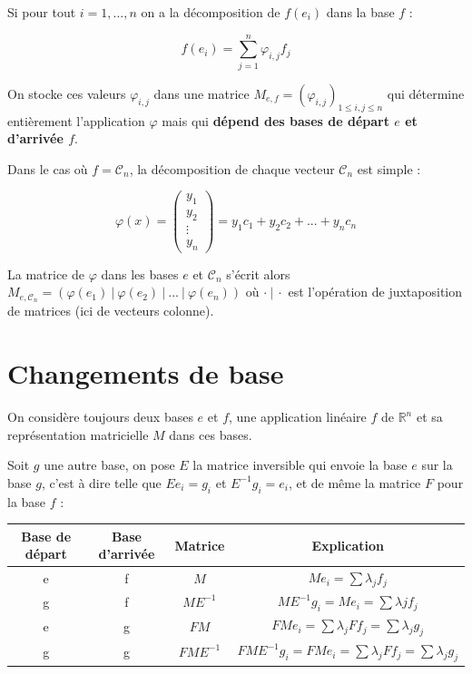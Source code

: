 \documentclass[]{article}
\theoremstyle{remark}
\theoremstyle{definition}
\begin{document}
	Si pour tout $i=1, ..., n$ on a la décomposition de $f(e_i)$ dans la base $f$ :
	
	$$f(e_i) = \sum_{j=1}^{n} \varphi_{i,j} f_j$$

	On stocke ces valeurs $\varphi_{i,j}$ dans une matrice $M_{e,f}=(\varphi_{i,j})_{1 \leqslant i, j \leqslant n}$ qui détermine entièrement l'application $\varphi$ mais qui \textbf{dépend des bases de départ $e$ et d'arrivée $f$}.

	Dans le cas où $f=\mathcal{C}_n$, la décomposition de chaque vecteur $\mathcal{C}_n$ est simple :
	
	$$\varphi(x) = \left(\begin{array}{c}
		y_1 \\ y_2 \\ \vdots \\y_n
	\end{array}\right) = y_1 c_1 + y_2 c_2 + ... + y_n c_n$$
	
	La matrice de $\varphi$ dans les bases $e$ et $\mathcal{C}_n$ s'écrit alors $M_{e, \mathcal{C}_n} = (\varphi(e_1) ~ | ~ \varphi(e_2) ~ | ~ ... ~ | ~\varphi(e_n))$ où $ \cdot ~ | ~ \cdot$ est l'opération de juxtaposition de matrices (ici de vecteurs colonne).
	
\section{Changements de base}
	
	On considère toujours deux bases $e$ et $f$, une application linéaire $f$ de $\mathbb{R}^n$ et sa représentation matricielle $M$ dans ces bases. 
	
	Soit $g$ une autre base, on pose $E$ la matrice inversible qui envoie la base $e$ sur la base $g$, c'est à dire telle que $E e_i=g_i$ et $E^{-1} g_i=e_i$, et de même la matrice $F$ pour la base $f$ :

\begin{center}
	\begin{tabular}{|c|c|c|c|}
		\hline
		Base de départ & Base d'arrivée & Matrice & Explication \\
		\hline
		e & f & $M$ & $Me_i = \sum \lambda_j f_j$ \\
		g & f & $ME^{-1}$ & $ME^{-1}g_i=M e_i = \sum \lambda j f_j$ \\
		e & g & $FM$ & $FM e_i = \sum \lambda_j F f_j = \sum \lambda_j g_j$ \\
		g & g & $FME^{-1}$ & $FME^{-1} g_i = FMe_i = \sum \lambda_j F f_j = \sum \lambda_j g_j$ \\
		\hline
	\end{tabular}
\end{center}
	 
\end{document}
